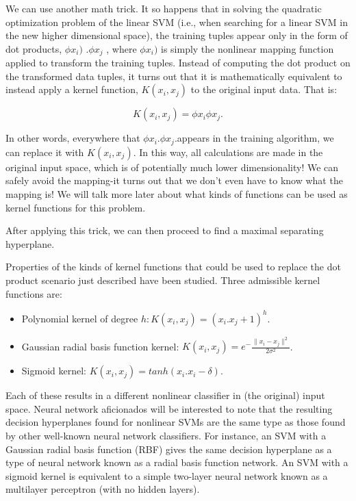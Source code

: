 We can use another math trick. It so happens that in solving the quadratic optimization problem of the linear SVM (i.e., when searching for a linear SVM in the new higher dimensional space), the training tuples appear only in the form of dot products, $\phi{x_i }) $ .$\phi{x_j } $ , where $\phi{x_i }) $ is simply the nonlinear mapping function applied to transform the training tuples. Instead of computing the dot product on the transformed data tuples, it turns out that it is mathematically equivalent to instead apply a kernel function, $K(x_i,x_j )$  to the original input data. That is:
\begin{dBox}
\begin{equation}
K(x_i,x_j) = \phi{x_i} \phi{x_j}.
\end{equation}
\end{dBox}

In other words, everywhere that $\phi{x_i}$.$\phi{x_j}.$appears in the training algorithm, we can replace it with $K(x_i,x_j )$. In this way, all calculations are made in the original input space, which is of potentially much lower dimensionality! We can safely avoid the mapping-it turns out that we don't even have to know what the mapping is! We will talk more later about what kinds of functions can be used as kernel functions for this problem.

After applying this trick, we can then proceed to find a maximal separating hyperplane.\bigskip

Properties of the kinds of kernel functions that could be used to replace the dot product scenario just described have been studied. Three admissible kernel functions are:

\begin{itemize}
\item Polynomial kernel of degree $h: K(x_i,x_j )=(x_i.x_j+1)^h$.
\item Gaussian radial basis function kernel: $K(x_i,x_j )=e^-\frac{\|x_i- x_j \|^2}{2\sigma^2}$.
\item Sigmoid kernel: $K(x_i,x_j )=tanh(x_i.x_i-\delta)$.
\end{itemize}

Each of these results in a different nonlinear classifier in (the original) input space. Neural network aficionados will be interested to note that the resulting decision hyperplanes found for nonlinear SVMs are the same type as those found by other well-known neural network classifiers. For instance, an SVM with a Gaussian radial basis function (RBF) gives the same decision hyperplane as a type of neural network known as a radial basis function network. An SVM with a sigmoid kernel is equivalent to a simple two-layer neural network known as a multilayer perceptron (with no hidden layers). \bigskip

